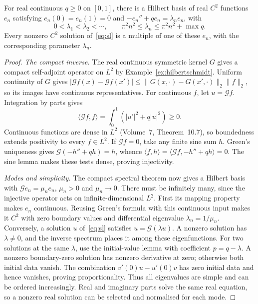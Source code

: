 \begin{theorem}\label{thm:sturm}
For real continuous $q\ge0$ on $[0,1]$, there is a Hilbert basis of real $C^2$ functions $e_n$ satisfying $e_n(0)=e_n(1)=0$ and $-e_n''+qe_n=\lambda_ne_n$, with
\[
0<\lambda_1<\lambda_2<\cdots,\qquad
\pi^2n^2\le\lambda_n\le\pi^2n^2+\max q.
\]
Every nonzero $C^2$ solution of~\eqref{eq:sl} is a multiple of one of these $e_n$, with the corresponding parameter $\lambda_n$.
\end{theorem}
\begin{proof}
\emph{The compact inverse.} The real continuous symmetric kernel $G$ gives a compact self-adjoint operator on $L^2$ by Example~\ref{ex:hilbertschmidt}. Uniform continuity of $G$ gives
$|\mathcal Gf(x)-\mathcal Gf(x')|\le\|G(x,\cdot)-G(x',\cdot)\|_2\|f\|_2$,
so its images have continuous representatives. For continuous $f$, let $u=\mathcal Gf$. Integration by parts gives
\[
\langle\mathcal Gf,f\rangle=\int_0^1(|u'|^2+q|u|^2)\ge0.
\]
Continuous functions are dense in $L^2$ (Volume~7, Theorem~10.7), so boundedness extends positivity to every $f\in L^2$.
If $\mathcal Gf=0$, take any finite sine sum $h$. Green's uniqueness gives $\mathcal G(-h''+qh)=h$, whence
$\langle f,h\rangle=\langle\mathcal Gf,-h''+qh\rangle=0$.
The sine lemma makes these tests dense, proving injectivity.

\emph{Modes and simplicity.} The compact spectral theorem now gives a Hilbert basis with $\mathcal Ge_n=\mu_ne_n$, $\mu_n>0$ and $\mu_n\to0$. There must be infinitely many, since the injective operator acts on infinite-dimensional $L^2$. First its mapping property makes $e_n$ continuous. Reusing Green's formula with this continuous input makes it $C^2$ with zero boundary values and differential eigenvalue $\lambda_n=1/\mu_n$.
Conversely, a solution $u$ of~\eqref{eq:sl} satisfies $u=\mathcal G(\lambda u)$. A nonzero solution has $\lambda\ne0$, and the inverse spectrum places it among these eigenfunctions.
For two solutions at the same $\lambda$, use the initial-value lemma with coefficient $p=q-\lambda$. A nonzero boundary-zero solution has nonzero derivative at zero; otherwise both initial data vanish. The combination $v'(0)u-u'(0)v$ has zero initial data and hence vanishes, proving proportionality. Thus all eigenvalues are simple and can be ordered increasingly. Real and imaginary parts solve the same real equation, so a nonzero real solution can be selected and normalised for each mode.


\end{proof}
